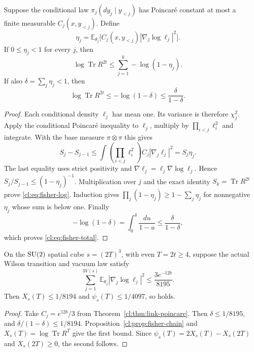 \begin{proposition}\label{cl:prop:fisher-chain}
Suppose the conditional law $\pi_j(dy_j\mid y_{<j})$ has Poincar\'e
constant at most a finite measurable $C_j(x,y_{<j})$. Define
\[
\eta_j=\mathbb E_{\theta_j}
       \bigl[C_j(x,y_{<j})|\nabla_j\log\ell_j|^2\bigr].
\]
If $0\le\eta_j<1$ for every $j$, then
\begin{equation}\label{cl:eq:fisher-log}
\log\operatorname{Tr}R^{2t}
\le\sum_{j=1}^k-\log(1-\eta_j).
\end{equation}
If also $\delta=\sum_j\eta_j<1$, then
\begin{equation}\label{cl:eq:fisher-total}
\log\operatorname{Tr}R^{2t}
\le-\log(1-\delta)\le\frac{\delta}{1-\delta}.
\end{equation}
\end{proposition}
\begin{proof}
Each conditional density $\ell_j$ has mean one. Its variance is therefore
$\chi_j^2$. Apply the conditional Poincar\'e inequality to $\ell_j$,
multiply by $\prod_{i<j}\ell_i^2$ and integrate. With the base measure
$\pi\otimes\pi$ this gives
\[
S_j-S_{j-1}
\le\int\!\left(\prod_{i<j}\ell_i^2\right)C_j|\nabla_j\ell_j|^2
=S_j\eta_j.
\]
The last equality uses strict positivity and
$\nabla\ell_j=\ell_j\nabla\log\ell_j$. Hence
$S_j/S_{j-1}\le(1-\eta_j)^{-1}$. Multiplication over $j$ and the exact
identity $S_k=\operatorname{Tr}R^{2t}$ prove \eqref{cl:eq:fisher-log}.
Induction gives $\prod_j(1-\eta_j)\ge1-\sum_j\eta_j$ for nonnegative
$\eta_j$ whose sum is below one. Finally
\[
-\log(1-\delta)=\int_0^\delta\frac{du}{1-u}
\le\frac{\delta}{1-\delta},
\]
which proves \eqref{cl:eq:fisher-total}.
\end{proof}

\begin{corollary}\label{cl:cor:wilson-score}
On the $\mathrm{SU}(2)$ spatial cube $s=(2T)^3$, with even $T=2t\ge4$, suppose
the actual Wilson transition and vacuum law satisfy
\begin{equation}\label{cl:eq:wilson-score-target}
\sum_{j=1}^{3V(s)}\mathbb E_{\theta_j}
       |\nabla_j\log\ell_j|^2\le\frac{3e^{-12b}}{8195}.
\end{equation}
Then $X_s(T)\le1/8194$ and $\psi_s(T)\le1/4097$, so \Mcirc{} holds.
\end{corollary}
\begin{proof}
Take $C_j=e^{12b}/3$ from Theorem~\ref{cl:thm:link-poincare}.
Then $\delta\le1/8195$, and
$\delta/(1-\delta)\le1/8194$. Proposition~\ref{cl:prop:fisher-chain}
and $X_s(T)=\log\operatorname{Tr}R^T$ give the first bound. Since
$\psi_s(T)=2X_s(T)-X_s(2T)$ and $X_s(2T)\ge0$, the second follows.
\end{proof}

